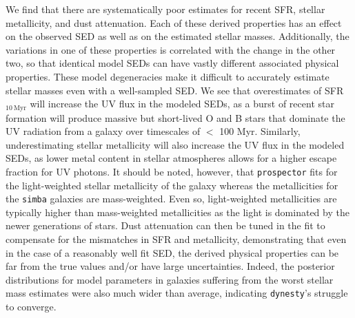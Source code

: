 \documentclass[twocolumn]{aastex62}
\begin{document}
We find that there are systematically poor estimates for recent SFR, stellar metallicity, and dust attenuation. Each of these derived properties has an effect on the observed SED as well as on the estimated stellar masses. Additionally, the variations in one of these properties is correlated with the change in the other two, so that identical model SEDs can have vastly different associated physical properties. These model degeneracies make it difficult to accurately estimate stellar masses even with a well-sampled SED. We see that overestimates of SFR$_{10 \: \mathrm{Myr}}$ will increase the UV flux in the modeled SEDs, as a burst of recent star formation will produce massive but short-lived O and B stars that dominate the UV radiation from a galaxy over timescales of $<$ 100 Myr. Similarly, underestimating stellar metallicity will also increase the UV flux in the modeled SEDs, as lower metal content in stellar atmospheres allows for a higher escape fraction for UV photons. It should be noted, however, that \texttt{prospector} fits for the light-weighted stellar metallicity of the galaxy whereas the metallicities for the \texttt{simba} galaxies are mass-weighted. Even so, light-weighted metallicities are typically higher than mass-weighted metallicities as the light is dominated by the newer generations of stars. Dust attenuation can then be tuned in the fit to compensate for the mismatches in SFR and metallicity, demonstrating that even in the case of a reasonably well fit SED, the derived physical properties can be far from the true values and/or have large uncertainties. Indeed, the posterior distributions for model parameters in galaxies suffering from the worst stellar mass estimates were also much wider than average, indicating \texttt{dynesty}'s struggle to converge. 
\end{document}
